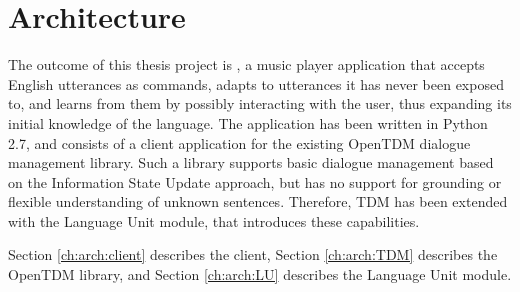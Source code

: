 
\chapter{Architecture} %

\label{ch:arch} %



The outcome of this thesis project is \pname, a music player application that accepts English utterances as commands, adapts to utterances it has never been exposed to, and learns from them by possibly interacting with the user, thus expanding its initial knowledge of the language. The application has been written in Python 2.7, and consists of a client application for the existing OpenTDM dialogue management library. Such a library supports basic dialogue management based on the Information State Update approach, but has no support for grounding or flexible understanding of unknown sentences. Therefore, TDM has been extended with the Language Unit module, that introduces these capabilities.

Section \ref{ch:arch:client} describes the \pname client, Section \ref{ch:arch:TDM} describes the OpenTDM library, and Section \ref{ch:arch:LU} describes the Language Unit module.



